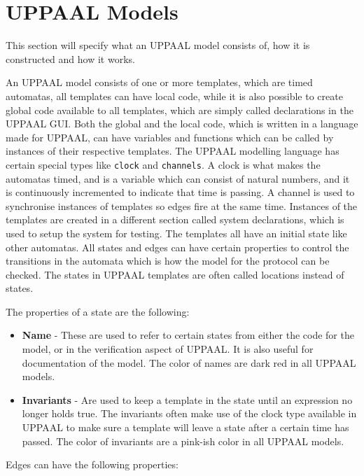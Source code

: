 \section{UPPAAL Models}
This section will specify what an UPPAAL model consists of, how it is constructed and how it works.

An UPPAAL model consists of one or more templates, which are timed automatas, all templates can have local code, while it is also possible to create global code available to all templates, which are simply called declarations in the UPPAAL GUI.
Both the global and the local code, which is written in a language made for UPPAAL, can have variables and functions which can be called by instances of their respective templates.
The UPPAAL modelling language has certain special types like \texttt{clock} and \texttt{channels}.
A clock is what makes the automatas timed, and is a variable which can consist of natural numbers, and it is continuously incremented to indicate that time is passing.
A channel is used to synchronise instances of templates so edges fire at the same time.
Instances of the templates are created in a different section called system declarations, which is used to setup the system for testing.
The templates all have an initial state like other automatas.
All states and edges can have certain properties to control the transitions in the automata which is how the model for the protocol can be checked.
The states in UPPAAL templates are often called locations instead of states.

The properties of a state are the following: 

\begin{itemize}
	\item \textbf{Name} - These are used to refer to certain states from either the code for the model, or in the verification aspect of UPPAAL. It is also useful for documentation of the model. The color of names are dark red in all UPPAAL models.
	\item \textbf{Invariants} - Are used to keep a template in the state until an expression no longer holds true. The invariants often make use of the clock type available in UPPAAL to make sure a template will leave a state after a certain time has passed. The color of invariants are a pink-ish color in all UPPAAL models.
\end{itemize}

Edges can have the following properties:

